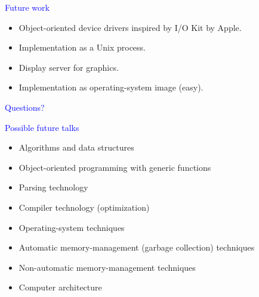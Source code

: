 \documentclass{slides}
\newcommand{\ti}[1]{\begin{center}\Large{\textcolor{blue}{#1}}\end{center}}
\begin{document}
\begin{slide}\ti{Future work}

  \begin{itemize}
  \item Object-oriented device drivers inspired by I/O Kit by Apple.
  \item Implementation as a Unix process.
  \item Display server for graphics.
  \item Implementation as operating-system image (easy).
  \end{itemize}

\vfill\end{slide}
\begin{slide}\ti{Questions?}

\vfill\end{slide}
\begin{slide}\ti{Possible future talks}

  \begin{itemize}
  \item Algorithms and data structures
  \item Object-oriented programming with generic functions
  \item Parsing technology
  \item Compiler technology (optimization)
  \item Operating-system techniques
  \item Automatic memory-management (garbage collection) techniques
  \item Non-automatic memory-management techniques
  \item Computer architecture
  \end{itemize}

\vfill\end{slide}



\end{document}
